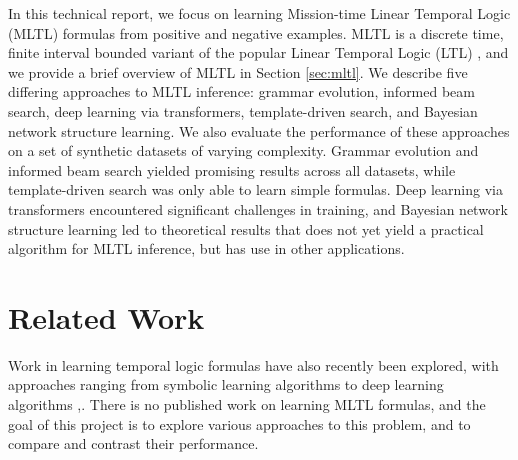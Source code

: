 \documentclass[runningheads]{llncs}
\renewcommand{\phi}{\varphi}
\begin{document}
In this technical report, we focus on learning Mission-time Linear Temporal Logic (MLTL) formulas from positive and negative examples.
MLTL is a discrete time, finite interval bounded variant of the popular Linear Temporal Logic (LTL) \cite{Pnueli77}, and we provide a brief overview of MLTL in Section \ref{sec:mltl}.
We describe five differing approaches to MLTL inference: grammar evolution, informed beam search, deep learning via transformers, template-driven search, and Bayesian network structure learning.
We also evaluate the performance of these approaches on a set of synthetic datasets of varying complexity.
Grammar evolution and informed beam search yielded promising results across all datasets, while template-driven search was only able to learn simple formulas.
Deep learning via transformers encountered significant challenges in training, and Bayesian network structure learning led to theoretical results that does not yet yield a practical algorithm for MLTL inference, but has use in other applications.

\section{Related Work}
Work in learning temporal logic formulas have also recently been explored, with approaches ranging from symbolic learning algorithms \cite{roy_ltlf_learning} \cite{camacho_ltlf_learning} to deep learning algorithms \cite{stl_learning},\cite{Luo_Liang_Du_Wan_Peng_Zhang_2022}.
There is no published work on learning MLTL formulas, and the goal of this project is to explore various approaches to this problem, and to compare and contrast their performance.

\end{document}
